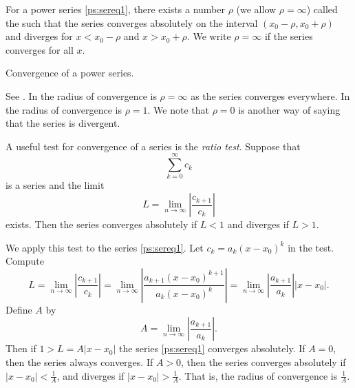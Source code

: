 \documentclass{ximera}
\begin{document}
\begin{theorem}{}
    For a power series \eqref{ps:sereq1}, there exists a number $\rho$ (we allow $\rho=\infty$) called the \emph{} such that the series converges absolutely on the interval $(x_0-\rho,x_0+\rho)$ and diverges for $x < x_0-\rho$ and $x > x_0+\rho$. We write $\rho=\infty$ if the series converges for all $x$.
\end{theorem}

\begin{myfig}
    \capstart
    
    \caption{Convergence of a power series.\label{ps:convfig}}
\end{myfig}

See . In  the radius of convergence is $\rho = \infty$ as the series converges everywhere.  In  the radius of convergence is $\rho=1$. We note that $\rho = 0$ is another way of saying that the series is divergent.

A useful test for convergence of a series is the \emph{ratio test}.  Suppose that
\begin{equation*}
    \sum_{k=0}^\infty c_k
\end{equation*}
is a series and the limit
\begin{equation*}
    L = \lim_{n\to\infty} \left \lvert \frac{c_{k+1}}{c_k} \right \rvert
\end{equation*}
exists.  Then the series converges absolutely if $L < 1$ and diverges if $L > 1$.

We apply this test to the series \eqref{ps:sereq1}. Let $c_k = a_k {(x - x_0)}^k$ in the test.  Compute
\begin{equation*}
    L = \lim_{n\to\infty} \left \lvert \frac{c_{k+1}}{c_k} \right \rvert
    = \lim_{n\to\infty} \left \lvert \frac{a_{k+1} {(x - x_0)}^{k+1}}{a_k {(x - x_0)}^k} \right \rvert 
    = \lim_{n\to\infty} \left \lvert \frac{a_{k+1}}{a_k} \right \rvert \lvert  x - x_0 \rvert .
\end{equation*}
Define $A$ by
\begin{equation*}
    A = \lim_{n\to\infty} \left \lvert \frac{a_{k+1}}{a_k} \right \rvert .
\end{equation*}
Then if $1 > L = A \lvert x - x_0 \rvert$ the series \eqref{ps:sereq1} converges absolutely. If $A = 0$, then the series always converges.  If $A > 0$, then the series converges absolutely if $\lvert x - x_0 \rvert < \frac{1}{A}$, and diverges if $\lvert x - x_0 \rvert > \frac{1}{A}$.  That is, the radius of convergence is $\frac{1}{A}$.
\end{document}

